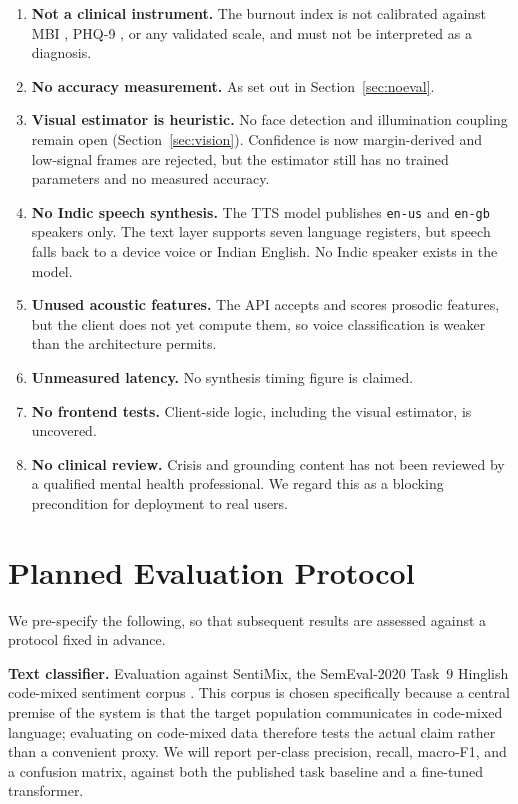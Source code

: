 \documentclass[runningheads]{llncs}
\begin{document}
\begin{enumerate}
\item \textbf{Not a clinical instrument.} The burnout index is not calibrated
against MBI \cite{maslach}, PHQ-9 \cite{phq9}, or any validated scale, and must
not be interpreted as a diagnosis.
\item \textbf{No accuracy measurement.} As set out in
Section~\ref{sec:noeval}.
\item \textbf{Visual estimator is heuristic.} No face detection and
illumination coupling remain open (Section~\ref{sec:vision}). Confidence is
now margin-derived and low-signal frames are rejected, but the estimator still
has no trained parameters and no measured accuracy.
\item \textbf{No Indic speech synthesis.} The TTS model publishes
\texttt{en-us} and \texttt{en-gb} speakers only. The text layer supports seven
language registers, but speech falls back to a device voice or Indian English.
No Indic speaker exists in the model.
\item \textbf{Unused acoustic features.} The API accepts and scores prosodic
features, but the client does not yet compute them, so voice classification is
weaker than the architecture permits.
\item \textbf{Unmeasured latency.} No synthesis timing figure is claimed.
\item \textbf{No frontend tests.} Client-side logic, including the visual
estimator, is uncovered.
\item \textbf{No clinical review.} Crisis and grounding content has not been
reviewed by a qualified mental health professional. We regard this as a
blocking precondition for deployment to real users.
\end{enumerate}

\section{Planned Evaluation Protocol}
\label{sec:protocol}

We pre-specify the following, so that subsequent results are assessed against
a protocol fixed in advance.

\textbf{Text classifier.} Evaluation against SentiMix, the SemEval-2020 Task~9
Hinglish code-mixed sentiment corpus \cite{sentimix}. This corpus is chosen
specifically because a central premise of the system is that the target
population communicates in code-mixed language; evaluating on code-mixed data
therefore tests the actual claim rather than a convenient proxy. We will report
per-class precision, recall, macro-F1, and a confusion matrix, against both the
published task baseline and a fine-tuned transformer.
\end{document}
